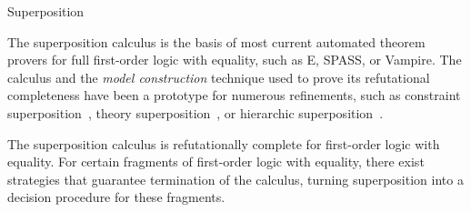 \begin{entry}{Superposition}
\begin{history}
The superposition calculus is the basis of most current automated
theorem provers for full first-order logic with equality,
such as E, SPASS, or Vampire.
The calculus and the \emph{model construction} technique used
to prove its refutational completeness have been a prototype
for numerous refinements, such as
constraint superposition~,
theory superposition~,
or hierarchic superposition~.

\end{history}

\begin{technicalities}
The superposition calculus is refutationally complete for
first-order logic with equality.
For certain fragments of first-order logic with equality,
there exist strategies that guarantee termination of the calculus,
turning superposition into a decision procedure for these fragments.
\end{technicalities}



\end{entry}

